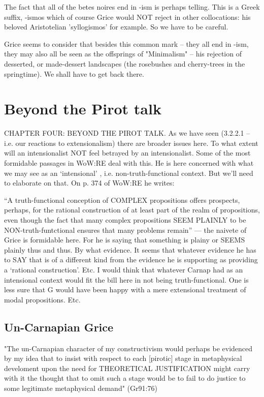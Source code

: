\documentclass[10pt,titlepage]{book}
\begin{document}
{The fact that all  of the betes noires end in -ism is perhaps telling. This 
is a Greek suffix,  -ismos which of course Grice would NOT reject in other 
collocations: his beloved  Aristotelian 'syllogismos' for example. So we 
have to be  careful.
 
Grice seems to  consider that besides this common mark -- they all end in 
-ism, they may also  all be seen as the offsprings of "Minimalism" -- his 
rejection of desserted, or  made-dessert landscapes (the rosebushes and 
cherry-trees in the springtime). We  shall have to get back there.
 
\section{Beyond the Pirot talk}

CHAPTER  FOUR: BEYOND THE PIROT TALK.
As  we have seen (3.2.2.1 – i.e. our reactions to extensionalism) there are 
broader  issues here. To what extent will an intensionalist NOT feel 
betrayed by an  intensionalist. Some of the most formidable passages in WoW:RE 
deal with this.  He is here concerned with what we may see as an ‘intensional’
, i.e.  non-truth-functional context. But we’ll need to elaborate on that. 
On p. 374 of  WoW:RE he writes:

“A truth-functional conception of COMPLEX propositions  offers prospects, 
perhaps, for the rational construction of at least part of the  realm of 
propositions, even though the fact that many complex propositions SEEM  PLAINLY 
to be NON-truth-funtctional ensures that many problems  remain” 
---  the naivete of Grice is formidable here. For he is saying that 
something is  plainy or SEEMS plainly thus and thus. By what evidence. It seems 
that whatever  evidence he has to SAY that is of a different kind from the 
evidence he is  supporting as providing a ‘rational construction’. Etc. I would 
think that  whatever Carnap had as an intensional context would fit the 
bill here in not  being truth-functional. One is less sure that G would have 
been happy with a  mere extensional treatment of modal propositions.  Etc.
 
\subsection{Un-Carnapian Grice}

"The un-Carnapian character of my
constructivism would perhaps  be
evidenced by my idea that to insist
with respect to each [pirotic]  stage
in metaphysical develoment
upon the need for
THEORETICAL  JUSTIFICATION
might carry with it the thought
that to omit such a  stage
would be to fail to do justice
to some legitimate
metaphysical  demand"
    (Gr91:76)
 
}
\end{document}
